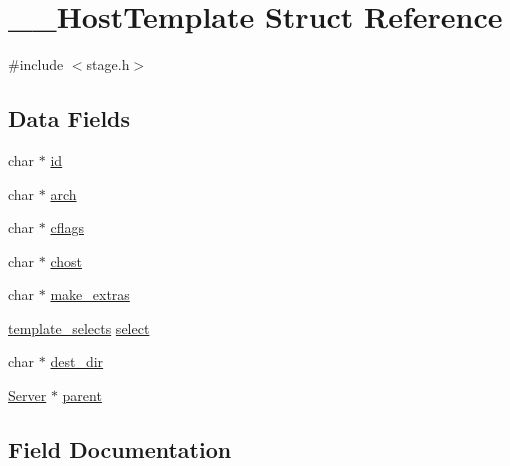 \hypertarget{struct_____host_template}{}\section{\+\_\+\+\_\+\+Host\+Template Struct Reference}
\label{struct_____host_template}


{\ttfamily \#include $<$stage.\+h$>$}

\subsection*{Data Fields}
\begin{DoxyCompactItemize}
\item 
char $\ast$ \mbox{\hyperlink{struct_____host_template_a6c8b983339976e4622f62d82c0b4fbf1}{id}}
\item 
char $\ast$ \mbox{\hyperlink{struct_____host_template_a6052713001eb237749beb250899b09ba}{arch}}
\item 
char $\ast$ \mbox{\hyperlink{struct_____host_template_a1e87b79a1795d0e02a913327e0d46878}{cflags}}
\item 
char $\ast$ \mbox{\hyperlink{struct_____host_template_a5ed1986b1774d3836e5f5f5d769de82f}{chost}}
\item 
char $\ast$ \mbox{\hyperlink{struct_____host_template_a80bac92c13aa822d5cff439c0d66a60f}{make\+\_\+extras}}
\item 
\mbox{\hyperlink{stage_8h_a3ba89b32a5d51c086fa5dfa12e879f06}{template\+\_\+selects}} \mbox{\hyperlink{struct_____host_template_ad1f4c7a1e25592181f63018195b4ff54}{select}}
\item 
char $\ast$ \mbox{\hyperlink{struct_____host_template_afca1e49a19d36cff4e745d615b33ab7a}{dest\+\_\+dir}}
\item 
\mbox{\hyperlink{server_8h_a705d964b8a67edeeb3943273a397e4c2}{Server}} $\ast$ \mbox{\hyperlink{struct_____host_template_aa8239544f5fd3a31a47940c7c0de5c5c}{parent}}
\end{DoxyCompactItemize}


\subsection{Field Documentation}
\mbox{\label{struct_____host_template_a6052713001eb237749beb250899b09ba}} 
